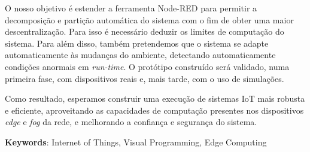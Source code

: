 \par O nosso objetivo é estender a ferramenta Node-RED para permitir a decomposição e partição automática do sistema com o fim de obter uma maior descentralização. Para isso é necessário deduzir os limites de computação do sistema. Para além disso, também pretendemos que o sistema se adapte automaticamente às mudanças do ambiente, detectando automaticamente condições anormais em \emph{run-time}. O protótipo construído será validado, numa primeira fase, com dispositivos reais e, mais tarde, com o uso de simulações.
\par Como resultado, esperamos construir uma execução de sistemas IoT mais robusta e eficiente, aproveitando as capacidades de computação presentes nos dispositivos \emph{edge} e \emph{fog} da rede, e melhorando a confiança e segurança do sistema.

\vspace*{10mm}\noindent
\textbf{Keywords}: Internet of Things, Visual Programming, Edge Computing
